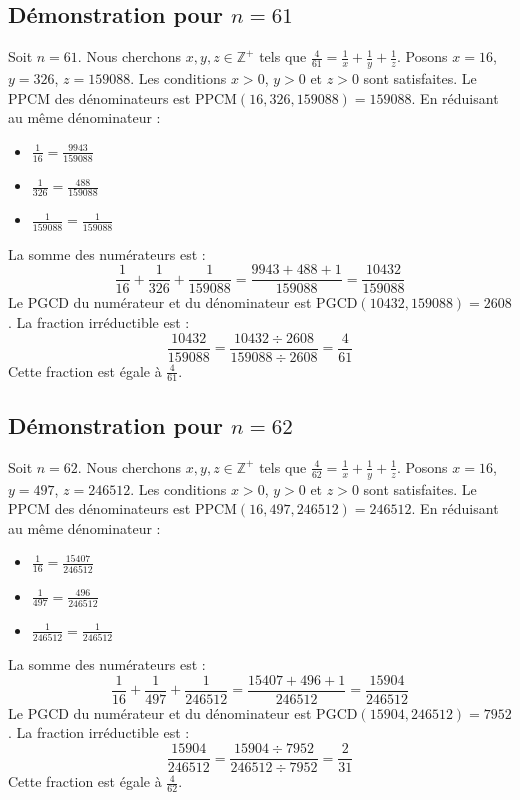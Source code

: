 \documentclass[11pt,a4paper]{article}
\begin{document}
\subsection{Démonstration pour $n = 61$}
Soit $n = 61$. Nous cherchons $x, y, z \in \mathbb{Z}^{+}$ tels que $\frac{4}{61} = \frac{1}{x} + \frac{1}{y} + \frac{1}{z}$.
Posons $x = 16$, $y = 326$, $z = 159088$.
Les conditions $x > 0$, $y > 0$ et $z > 0$ sont satisfaites.
Le PPCM des dénominateurs est $\text{PPCM}(16, 326, 159088) = 159088$.
En réduisant au même dénominateur :
\begin{itemize}
    \item $\frac{1}{16} = \frac{9943}{159088}$
    \item $\frac{1}{326} = \frac{488}{159088}$
    \item $\frac{1}{159088} = \frac{1}{159088}$
\end{itemize}
La somme des numérateurs est :
$$ \frac{1}{16} + \frac{1}{326} + \frac{1}{159088} = \frac{9943 + 488 + 1}{159088} = \frac{10432}{159088} $$
Le PGCD du numérateur et du dénominateur est $\text{PGCD}(10432, 159088) = 2608$.
La fraction irréductible est :
$$ \frac{10432}{159088} = \frac{10432 \div 2608}{159088 \div 2608} = \frac{4}{61} $$
Cette fraction est égale à $\frac{4}{61}$.

\subsection{Démonstration pour $n = 62$}
Soit $n = 62$. Nous cherchons $x, y, z \in \mathbb{Z}^{+}$ tels que $\frac{4}{62} = \frac{1}{x} + \frac{1}{y} + \frac{1}{z}$.
Posons $x = 16$, $y = 497$, $z = 246512$.
Les conditions $x > 0$, $y > 0$ et $z > 0$ sont satisfaites.
Le PPCM des dénominateurs est $\text{PPCM}(16, 497, 246512) = 246512$.
En réduisant au même dénominateur :
\begin{itemize}
    \item $\frac{1}{16} = \frac{15407}{246512}$
    \item $\frac{1}{497} = \frac{496}{246512}$
    \item $\frac{1}{246512} = \frac{1}{246512}$
\end{itemize}
La somme des numérateurs est :
$$ \frac{1}{16} + \frac{1}{497} + \frac{1}{246512} = \frac{15407 + 496 + 1}{246512} = \frac{15904}{246512} $$
Le PGCD du numérateur et du dénominateur est $\text{PGCD}(15904, 246512) = 7952$.
La fraction irréductible est :
$$ \frac{15904}{246512} = \frac{15904 \div 7952}{246512 \div 7952} = \frac{2}{31} $$
Cette fraction est égale à $\frac{4}{62}$.
\end{document}
